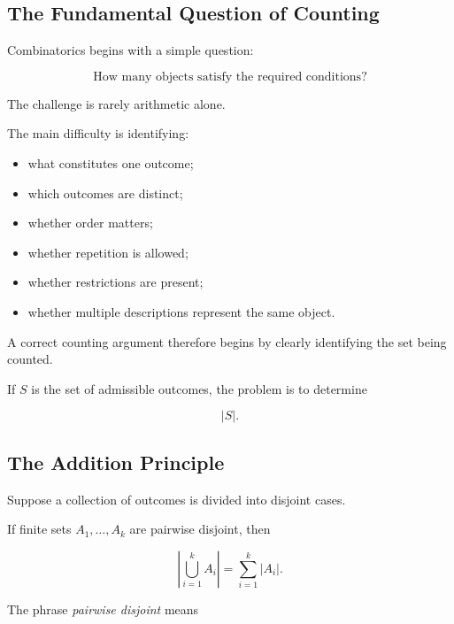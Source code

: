 \subsection{The Fundamental Question of Counting}
\label{subsec:fundamental-question-counting}

Combinatorics begins with a simple question:

\[
\boxed{
\text{How many objects satisfy the required conditions?}
}
\]

The challenge is rarely arithmetic alone.

The main difficulty is identifying:

\begin{itemize}
    \item what constitutes one outcome;
    \item which outcomes are distinct;
    \item whether order matters;
    \item whether repetition is allowed;
    \item whether restrictions are present;
    \item whether multiple descriptions represent the same object.
\end{itemize}

A correct counting argument therefore begins by clearly identifying the
set being counted.

If \(S\) is the set of admissible outcomes, the problem is to determine

\[
|S|.
\]

\subsection{The Addition Principle}
\label{subsec:addition-principle}

Suppose a collection of outcomes is divided into disjoint cases.

\begin{theorem}
If finite sets \(A_1,\ldots,A_k\) are pairwise disjoint, then

\[
\boxed{
\left|
\bigcup_{i=1}^{k}A_i
\right|
=
\sum_{i=1}^{k}|A_i|.
}
\]
\end{theorem}

The phrase \emph{pairwise disjoint} means

